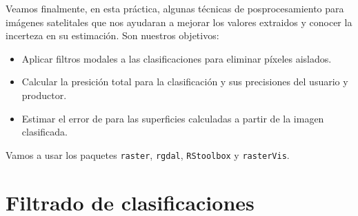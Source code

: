 Veamos finalmente, en esta pr\'actica, algunas t\'ecnicas de posprocesamiento para im\'agenes satelitales que nos ayudaran a mejorar los valores extraidos y conocer la incerteza en su estimaci\'on. Son nuestros objetivos:

\begin{itemize}
  \item Aplicar filtros modales a las clasificaciones para eliminar p\'ixeles aislados.
  \item Calcular la presici\'on total para la clasificaci\'on y sus precisiones del usuario y productor.
  \item Estimar el error de para las superficies calculadas a partir de la imagen clasificada.
\end{itemize}

Vamos a usar los paquetes \texttt{raster}, \texttt{rgdal}, \texttt{RStoolbox} y \texttt{rasterVis}.

\section{Filtrado de clasificaciones}

